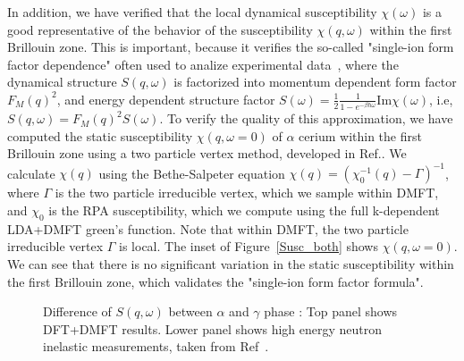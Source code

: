\documentclass[10pt]{ruthesis}
\begin{document}
{In addition, we have verified that the local dynamical susceptibility
$\chi(\omega)$ is a good representative of the behavior of the
susceptibility $\chi(q,\omega)$ within the first Brillouin zone.  This
is important, because it verifies the so-called "single-ion form
factor dependence" often used to analize experimental
data~\cite{murani}, where the dynamical structure $S(q,\omega)$ is
factorized into momentum dependent form factor $F_M(q)^2$, and
energy dependent structure factor
$S(\omega)=\frac{1}{2}\frac{1}{1-e^{-\beta\hbar\omega}}$Im$\chi(\omega)$,
i.e, $S(q,\omega) = F_M(q)^2 S(\omega)$.  To verify the quality of
this approximation, we have computed the static susceptibility
$\chi(q, \omega=0)$ of $\alpha$ cerium within the first Brillouin zone
using a two particle vertex method, developed in
Ref.\cite{Park_prl11}.  We calculate $\chi(q)$ using the
Bethe-Salpeter equation $\chi(q)= (\chi_{0}^{-1}(q)-\Gamma)^{-1}$,
where $\Gamma$ is the two particle irreducible vertex, which we sample
within DMFT, and $\chi_0$ is the RPA susceptibility, which we compute
using the full k-dependent LDA+DMFT green's function. Note that within
DMFT, the two particle irreducible vertex $\Gamma$ is local. The inset
of Figure~\ref{Susc_both} shows $\chi(q, \omega=0)$. We can see that
there is no significant variation in the static susceptibility within
the first Brillouin zone, which validates the "single-ion form factor
formula".
%
\begin{figure}[t]
\caption{Difference of $S(q,\omega)$ between $\alpha$ and $\gamma$ phase :
  Top panel shows DFT+DMFT  results. Lower panel shows high energy neutron
  inelastic measurements, taken from Ref~\cite{murani}.
  }
\label{Sq}
\end{figure}
%

}
\end{document}

